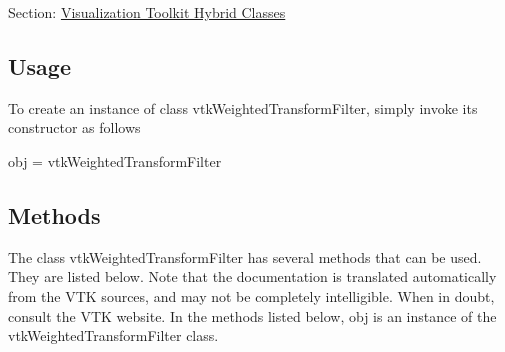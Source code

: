 Section\-: \hyperlink{sec_vtkhybrid}{Visualization Toolkit Hybrid Classes} \hypertarget{vtkwidgets_vtkxyplotwidget_Usage}{}\subsection{Usage}\label{vtkwidgets_vtkxyplotwidget_Usage}
To create an instance of class vtk\-Weighted\-Transform\-Filter, simply invoke its constructor as follows \begin{DoxyVerb}  obj = vtkWeightedTransformFilter
\end{DoxyVerb}
 \hypertarget{vtkwidgets_vtkxyplotwidget_Methods}{}\subsection{Methods}\label{vtkwidgets_vtkxyplotwidget_Methods}
The class vtk\-Weighted\-Transform\-Filter has several methods that can be used. They are listed below. Note that the documentation is translated automatically from the V\-T\-K sources, and may not be completely intelligible. When in doubt, consult the V\-T\-K website. In the methods listed below, {\ttfamily obj} is an instance of the vtk\-Weighted\-Transform\-Filter class. 
